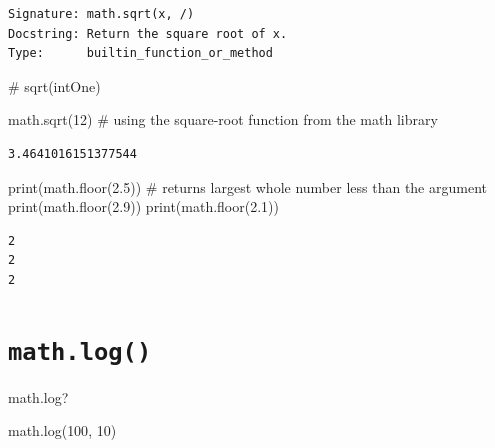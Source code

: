 \documentclass[
  letterpaper,
  DIV=11,
  numbers=noendperiod]{scrreprt}
\newenvironment{Shaded}{\begin{snugshade}}{\end{snugshade}}
\newcommand{\BuiltInTok}[1]{\textcolor[rgb]{0.00,0.23,0.31}{#1}}
\newcommand{\CommentTok}[1]{\textcolor[rgb]{0.37,0.37,0.37}{#1}}
\newcommand{\DecValTok}[1]{\textcolor[rgb]{0.68,0.00,0.00}{#1}}
\newcommand{\FloatTok}[1]{\textcolor[rgb]{0.68,0.00,0.00}{#1}}
\newcommand{\NormalTok}[1]{\textcolor[rgb]{0.00,0.23,0.31}{#1}}
\begin{document}
\begin{verbatim}
Signature: math.sqrt(x, /)
Docstring: Return the square root of x.
Type:      builtin_function_or_method
\end{verbatim}

\begin{Shaded}
\begin{Highlighting}[]
\CommentTok{\# sqrt(intOne)}
\end{Highlighting}
\end{Shaded}

\begin{Shaded}
\begin{Highlighting}[]
\NormalTok{math.sqrt(}\DecValTok{12}\NormalTok{) }\CommentTok{\# using the square{-}root function from the math library}
\end{Highlighting}
\end{Shaded}

\begin{verbatim}
3.4641016151377544
\end{verbatim}

\begin{Shaded}
\begin{Highlighting}[]
\BuiltInTok{print}\NormalTok{(math.floor(}\FloatTok{2.5}\NormalTok{)) }\CommentTok{\# returns largest whole number less than the argument}
\BuiltInTok{print}\NormalTok{(math.floor(}\FloatTok{2.9}\NormalTok{))}
\BuiltInTok{print}\NormalTok{(math.floor(}\FloatTok{2.1}\NormalTok{))}
\end{Highlighting}
\end{Shaded}

\begin{verbatim}
2
2
2
\end{verbatim}

\hypertarget{math.log}{%
\section{\texorpdfstring{\texttt{math.log()}}{math.log()}}\label{math.log}}

\begin{Shaded}
\begin{Highlighting}[]
\NormalTok{math.log?}
\end{Highlighting}
\end{Shaded}

\begin{Shaded}
\begin{Highlighting}[]
\NormalTok{math.log(}\DecValTok{100}\NormalTok{, }\DecValTok{10}\NormalTok{)}
\end{Highlighting}
\end{Shaded}
\end{document}
